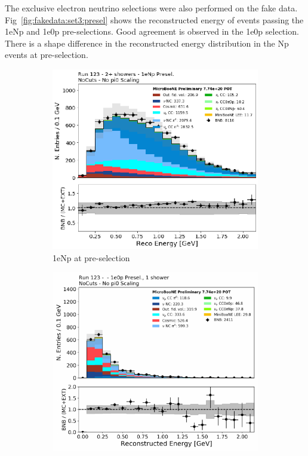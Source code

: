 The exclusive electron neutrino selections were also performed on the fake data. Fig~\ref{fig:fakedata:set3:presel} shows the reconstructed energy of events passing the 1eNp and 1e0p pre-selections.  Good agreement is observed in the 1e0p selection.  There is a shape difference in the reconstructed energy distribution in the Np events at pre-selection.

\begin{figure}[H] 
\begin{center}
    \begin{subfigure}[b]{0.45\textwidth}
    \centering
    \includegraphics[width=1.00\textwidth]{Fakedata/set3/np_2shr.pdf}
    \caption{\label{fig:fakedata:set3:Np_presel_recoe} 1eNp at pre-selection}
    \end{subfigure}
    \begin{subfigure}[b]{0.45\textwidth}
    \centering
    \includegraphics[width=1.00\textwidth]{Fakedata/set3/zp_presel_recoe.pdf}

\end{subfigure}
\end{center}
\end{figure}
